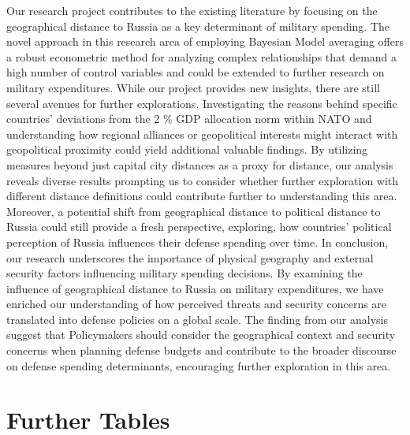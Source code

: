 \documentclass[12pt,a4paper]{article}
\begin{document}
Our research project contributes to the existing literature by focusing on the geographical distance to Russia as a key determinant of military spending. The novel approach in this research area of employing Bayesian Model averaging offers a robust econometric method for analyzing complex relationships that demand a high number of control variables and could be extended to further research on military expenditures. 
While our project provides new insights, there are still several avenues for further explorations. Investigating the reasons behind specific countries’ deviations from the 2 \% GDP allocation norm within NATO and understanding how regional alliances or geopolitical interests might interact with geopolitical proximity could yield additional valuable findings. 
By utilizing measures beyond just capital city distances as a proxy for distance, our analysis reveals diverse results prompting us to consider whether further exploration with different distance definitions could contribute further to understanding this area. Moreover, a potential shift from geographical distance to political distance to Russia could still provide a fresh perspective, exploring, how countries’ political perception of Russia influences their defense spending over time.
In conclusion, our research underscores the importance of physical geography and external security factors influencing military spending decisions. By examining the influence of geographical distance to Russia on military expenditures, we have enriched our understanding of how perceived threats and security concerns are translated into defense policies on a global scale. The finding from our analysis suggest that Policymakers should consider the geographical context and security concerns when planning defense budgets and contribute to the broader discourse on defense spending determinants, encouraging further exploration in this area.




\clearpage


\setcounter{page}{\thesavepage}
\pagestyle{plain}


\clearpage
\appendix
\section{Further Tables}
\label{Appendix Tables}
\end{document}
